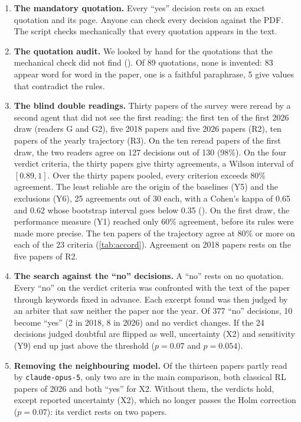 \begin{enumerate}
  \item \textbf{The mandatory quotation.} Every \enquote{yes} decision rests on an exact quotation
        and its page. Anyone can check every decision against the PDF. The script
         checks mechanically that every quotation appears in the text.
  \item \textbf{The quotation audit.} We looked by hand for the quotations that the mechanical check
        did not find (). Of
        89 quotations, none is invented: 83 appear word for word in the paper, one is a faithful
        paraphrase, 5 give values that contradict the rules.
  \item \textbf{The blind double readings.} Thirty papers of the survey were reread by a second agent
        that did not see the first reading: the first ten of the first 2026 draw (readers G and G2),
        five 2018 papers and five 2026 papers (R2), ten papers of the yearly trajectory (R3). On the
        ten reread papers of the first draw, the two readers agree on 127 decisions out of 130
        (98\%). On the four verdict criteria, the thirty papers give thirty agreements, a Wilson
        interval of $[0.89, 1]$. Over the thirty papers pooled, every criterion exceeds 80\%
        agreement. The least reliable are the origin of the baselines (Y5) and the exclusions (Y6),
        25 agreements out of 30 each, with a Cohen's kappa of 0.65 and 0.62 whose bootstrap interval
        goes below 0.35 (). On the first draw, the
        performance measure (Y1) reached only 60\% agreement, before its rules were made more
        precise. The ten papers of the trajectory agree at 80\% or more on each of the 23 criteria
        (\cref{tab:accord}). Agreement on 2018 papers rests on the five papers of R2.
  \item \textbf{The search against the \enquote{no} decisions.} A \enquote{no} rests on no
        quotation. Every \enquote{no} on the verdict criteria was confronted with the text of the
        paper through keywords fixed in advance. Each excerpt found was then judged by an arbiter that
        saw neither the paper nor the year. Of 377 \enquote{no} decisions, 10 become
        \enquote{yes} (2 in 2018, 8 in 2026) and no verdict changes. If the 24 decisions judged
        doubtful are flipped as well, uncertainty (X2) and sensitivity (Y9) end up just above the
        threshold ($p = 0.07$ and $p = 0.054$).
  \item \textbf{Removing the neighbouring model.} Of the thirteen papers partly read by
        \texttt{claude-opus-5}, only two are in the main comparison, both classical RL papers of 2026
        and both \enquote{yes} for X2. Without them, the verdicts hold, except reported uncertainty
        (X2), which no longer passes the Holm correction ($p = 0.07$): its verdict
        rests on two papers.
\end{enumerate}

